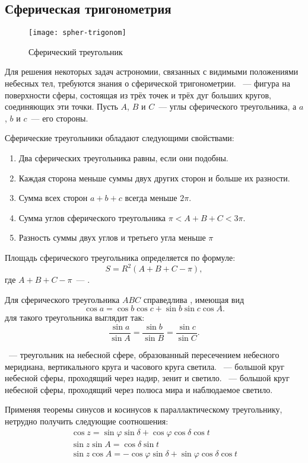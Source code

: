 \subsection{Сферическая тригонометрия}
\label{sec:spher-trig}
\begin{wrapfigure}[10]{r}{.3\tw}
	\centering
	\vspace{-1pc}
 	\texttt{[image: spher-trigonom]}
 	\caption{Сферический треугольник}
\end{wrapfigure}
Для решения некоторых задач астрономии, связанных с видимыми положениями небесных тел, требуются знания о сферической тригонометрии. ~--- фигура на поверхности сферы, состоящая из трёх точек и трёх дуг больших кругов, соединяющих эти точки. Пусть $A$, $B$ и $C$~--- углы сферического треугольника, а $a$, $b$ и $c$~--- его стороны.

Сферические треугольники обладают следующими свойствами:
\begin{enumerate}
\item Два сферических треугольника равны, если они подобны.
\item Каждая сторона меньше суммы двух других сторон и больше их разности.
\item Сумма всех сторон $a+b+c$ всегда меньше $2\pi$.
\item Сумма углов сферического треугольника $\pi < A + B + C < 3\pi$.
\item Разность суммы двух углов и третьего угла меньше $\pi$
\end{enumerate}

Площадь сферического треугольника определяется по формуле:
\begin{equation}
	S = R^2( A + B + C - \pi),
\end{equation}
где $A + B + C - \pi$~--- .

Для сферического треугольника $ABC$ справедлива , имеющая вид
\begin{equation}
\cos a=\cos b\cos c+\sin b\sin c\cos A.
\end{equation}
 для такого треугольника выглядит так:
\begin{equation}
\frac{\sin a}{\sin A} = \frac{\sin b}{\sin B} = \frac{\sin c}{\sin C}.
\end{equation}

~--- треугольник на небесной  сфере, образованный пересечением небесного меридиана, вертикального круга и часового круга светила. ~--- большой круг небесной сферы, проходящий через надир, зенит и светило. ~--- большой круг небесной сферы, проходящий через полюса мира и наблюдаемое светило.

Применяя теоремы синусов и косинусов к параллактическому треугольнику, нетрудно получить следующие соотношения:
\begin{gather}
\cos z=\sin\varphi\sin\delta+\cos\varphi\cos\delta\cos t\\
\sin z\sin A=\cos\delta\sin t\\
\sin z\cos A=-\cos\varphi\sin\delta+\sin\varphi\cos\delta\cos t
\end{gather}